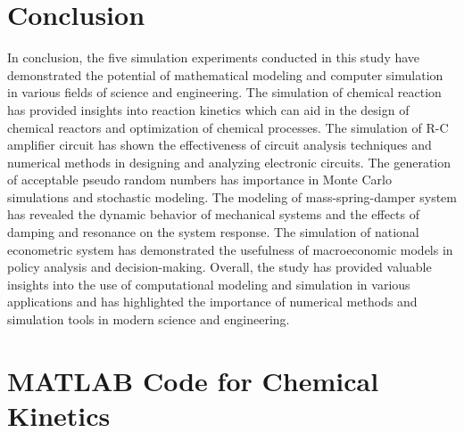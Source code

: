 \documentclass[10pt,journal,cspaper,compsoc]{IEEEtran}
\begin{document}
  \section{Conclusion}
  In conclusion, the five simulation experiments conducted in this study have demonstrated the potential of mathematical modeling and computer simulation in various fields of science and engineering. The simulation of chemical reaction has provided insights into reaction kinetics which can aid in the design of chemical reactors and optimization of chemical processes. The simulation of R-C amplifier circuit has shown the effectiveness of circuit analysis techniques and numerical methods in designing and analyzing electronic circuits. The generation of acceptable pseudo random numbers has importance in Monte Carlo simulations and stochastic modeling. The modeling of mass-spring-damper system has revealed the dynamic behavior of mechanical systems and the effects of damping and resonance on the system response. The simulation of national econometric system has demonstrated the usefulness of macroeconomic models in policy analysis and decision-making.  Overall, the study has provided valuable insights into the use of computational modeling and simulation in various applications and has highlighted the importance of numerical methods and simulation tools in modern science and engineering. 
\appendices
\section{MATLAB Code for Chemical Kinetics}

% 
% 
\end{document}

